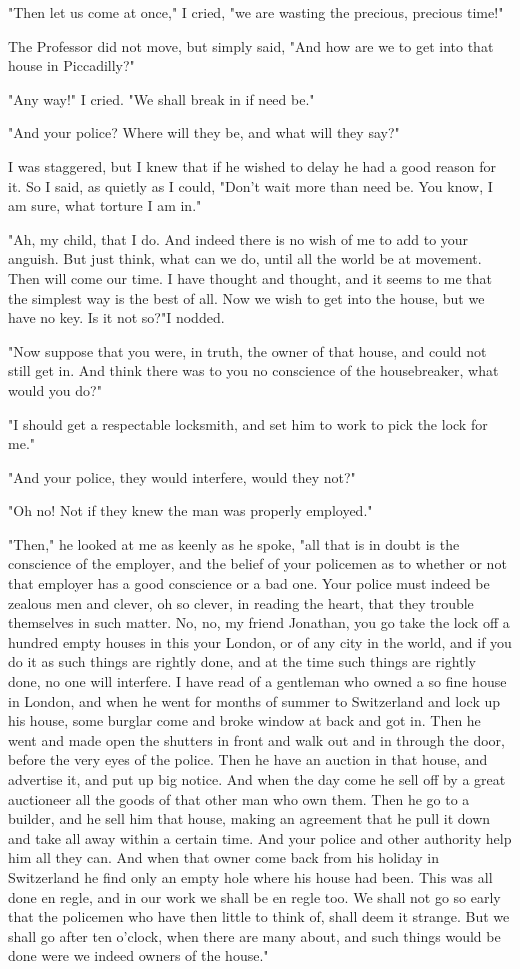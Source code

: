 "Then let us come at once," I cried, "we are wasting the precious, precious time!" 

The Professor did not move, but simply said, "And how are we to get into that house in Piccadilly?" 

"Any way!" I cried. "We shall break in if need be." 

"And your police? Where will they be, and what will they say?" 

I was staggered, but I knew that if he wished to delay he had a good reason for it. So I said, as quietly as I could, "Don't wait more than need be. You know, I am sure, what torture I am in." 

"Ah, my child, that I do. And indeed there is no wish of me to add to your anguish. But just think, what can we do, until all the world be at movement. Then will come our time. I have thought and thought, and it seems to me that the simplest way is the best of all. Now we wish to get into the house, but we have no key. Is it not so?"I nodded. 

"Now suppose that you were, in truth, the owner of that house, and could not still get in. And think there was to you no conscience of the housebreaker, what would you do?" 

"I should get a respectable locksmith, and set him to work to pick the lock for me." 

"And your police, they would interfere, would they not?" 

"Oh no! Not if they knew the man was properly employed." 

"Then," he looked at me as keenly as he spoke, "all that is in doubt is the conscience of the employer, and the belief of your policemen as to whether or not that employer has a good conscience or a bad one. Your police must indeed be zealous men and clever, oh so clever, in reading the heart, that they trouble themselves in such matter. No, no, my friend Jonathan, you go take the lock off a hundred empty houses in this your London, or of any city in the world, and if you do it as such things are rightly done, and at the time such things are rightly done, no one will interfere. I have read of a gentleman who owned a so fine house in London, and when he went for months of summer to Switzerland and lock up his house, some burglar come and broke window at back and got in. Then he went and made open the shutters in front and walk out and in through the door, before the very eyes of the police. Then he have an auction in that house, and advertise it, and put up big notice. And when the day come he sell off by a great auctioneer all the goods of that other man who own them. Then he go to a builder, and he sell him that house, making an agreement that he pull it down and take all away within a certain time. And your police and other authority help him all they can. And when that owner come back from his holiday in Switzerland he find only an empty hole where his house had been. This was all done en regle, and in our work we shall be en regle too. We shall not go so early that the policemen who have then little to think of, shall deem it strange. But we shall go after ten o'clock, when there are many about, and such things would be done were we indeed owners of the house." 


